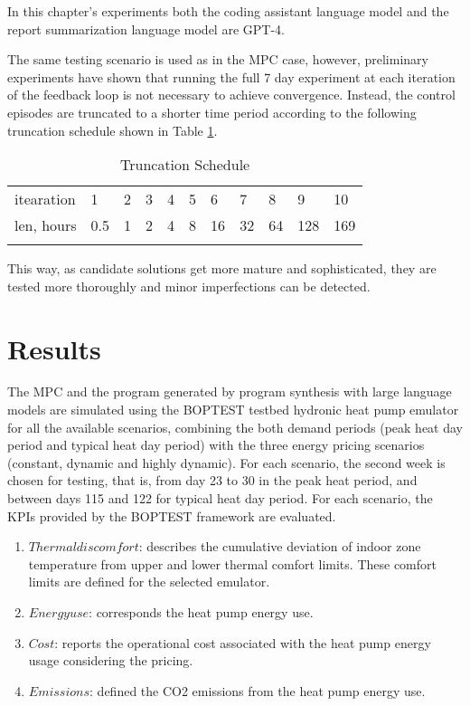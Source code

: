 In this chapter’s experiments both the coding assistant language model and the report summarization language model are GPT-4.

The same testing scenario is used as in the MPC case, however, preliminary experiments have shown that running the full 7 day experiment at each iteration of the feedback loop is not necessary to achieve convergence. Instead, the control episodes are truncated to a shorter time period according to the following truncation schedule shown in Table \ref{tab:1}.

\begin{table}
\caption{Truncation Schedule}
\label{tab:1}       %
\begin{tabular}{lllllllllll}
\hline\noalign{\smallskip}
itearation & 1 & 2 & 3 & 4 & 5 & 6 & 7 & 8 & 9 & 10 \\
\noalign{\smallskip}\hline\noalign{\smallskip}
len, hours & 0.5 & 1 & 2 & 4 & 8 & 16 & 32 & 64 & 128 & 169 \\
\noalign{\smallskip}\hline
\end{tabular}
\end{table}

This way, as candidate solutions get more mature and sophisticated, they are tested more thoroughly and minor imperfections can be detected.

\section{Results}
\label{sec:results}
The MPC and the program generated by program synthesis with large language models are simulated using the BOPTEST testbed hydronic heat pump emulator for all the available scenarios, combining the both demand periods (peak heat day period and typical heat day period) with the three energy pricing scenarios (constant, dynamic and highly dynamic). For each scenario, the second week is chosen for testing, that is, from day 23 to 30 in the peak heat period, and between days 115 and 122 for typical heat day period.
For each scenario, the KPIs provided by the BOPTEST framework are evaluated.
 \begin{enumerate}
     \item $Thermal discomfort$: describes the cumulative deviation of indoor zone temperature from upper and lower thermal comfort limits. These comfort limits are defined for the selected emulator.
     \item $Energy use$: corresponds the heat pump energy use.
     \item $Cost$: reports the operational cost associated with the heat pump energy usage considering the pricing.
     \item $Emissions$: defined the CO2 emissions from the heat pump energy use.
 \end{enumerate}
 

